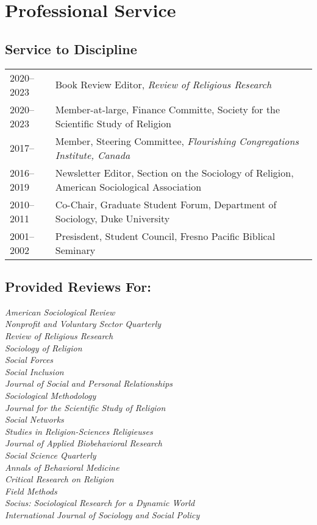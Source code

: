\section*{Professional Service}

\newcommand{\tabitem}{~~\llap{\textbullet}~~}
\subsection*{Service to Discipline}
\begin{tabular}{p{} p{}}
2020--2023 & Book Review Editor, \textit{Review of Religious Research}\\
2020--2023 & Member-at-large, Finance Committe, Society for the Scientific Study of Religion\\
2017-- & Member, Steering Committee, \textit{Flourishing Congregations Institute, Canada}\\
2016--2019 & Newsletter Editor, Section on the Sociology of Religion, American Sociological Association\\
2010--2011 & Co-Chair, Graduate Student Forum, Department of Sociology, Duke University\\
2001--2002 & Presisdent, Student Council, Fresno Pacific Biblical Seminary\\
\end{tabular}
\subsection*{Provided Reviews For:}
 \emph{American Sociological Review}\\
 \emph{Nonproﬁt and Voluntary Sector Quarterly}\\
 \emph{Review of Religious Research}\\
 \emph{Sociology of Religion}\\
 \emph{Social Forces}\\
 \emph{Social Inclusion}\\
 \emph{Journal of Social and Personal Relationships}\\
 \emph{Sociological Methodology}\\
 \emph{Journal for the Scientiﬁc Study of Religion}\\
 \emph{Social Networks}\\
 \emph{Studies in Religion-Sciences Religieuses}\\
 \emph{Journal of Applied Biobehavioral Research}\\
 \emph{Social Science Quarterly}\\
 \emph{Annals of Behavioral Medicine}\\
 \emph{Critical Research on Religion}\\
 \emph{Field Methods}\\
 \emph{Socius: Sociological Research for a Dynamic World}\\
 \emph{International Journal of Sociology and Social Policy}\\
